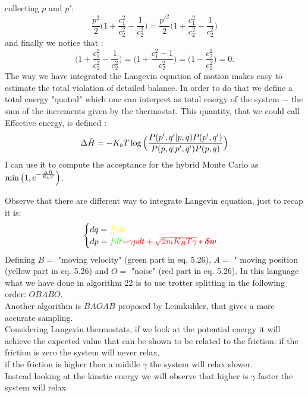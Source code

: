 collecting $p$ and $p'$:
    \begin{equation}
        \frac{p^2}{2} \Big(1 + \frac{c_1^2}{c_2^2} - \frac{1}{c_2^2}\Big) = \frac{p'^2}{2} \Big(1 + \frac{c_1^2}{c_2^2} - \frac{1}{c_2^2}\Big)
    \end{equation}
and finally we notice that :
    \begin{equation}
        \Big(1 + \frac{c_1^2}{c_2^2} - \frac{1}{c_2^2}\Big) = \Big(1 + \frac{c_1^2 - 1}{c_2^2}\Big) = \Big(1 - \frac{c_2^2}{c_2^2}\Big) = 0.
    \end{equation}
The way we have integrated the Langevin equation of motion makes easy to estimate the total violation of detailed balance. In order to do that we define a total energy "quoted" which one can interpret as total energy of the system $-$ the sum of the increments given by the thermostat. This quantity, that we could call Effective energy, is defined :
    \begin{equation}
        \Delta\Tilde{H} = - K_b T \log \Big( \frac{P(p',q'|p,q) P(p',q')}{P(p,q|p',q') P(p,q)} \Big)
    \end{equation}
I can use it to compute the acceptance for the hybrid Monte Carlo as $\min\big(1, e^{-\frac{\Delta\Tilde{H}}{K_bT}} \Big)$.

Observe that there are different way to integrate Langevin equation, just to recap it is:
\begin{equation}
    \begin{cases}
    dq = \color{yellow}{\frac{p}{m}dt}\\
    dp = \color{green}{f dt} \color{red}{-\gamma p dt + \sqrt{2mK_BT\gamma}* \boldsymbol{\delta w}}
    \end{cases}
\end{equation}
Defining $B =$ "moving velocity" (green part in eq. 5.26), $A =$ " moving position (yellow part in eq. 5.26) and $O = $ "noise" (red part in eq. 5.26). In this language
what we have done in algorithm 22 is to use trotter splitting in the following order: $OBABO$.\\
Another algorithm is $BAOAB$ proposed by Leimkuhler, that gives a more accurate sampling.\\
Considering Langevin thermostats, if we look at the potential energy it will achieve the expected value that can be shown to be related to the friction:
if the friction is zero the system will never relax,\\
if the friction is higher then a middle $\gamma$ the system will relax slower.\\
Instead looking at the kinetic energy we will observe that higher is $\gamma$ faster the system will relax.

